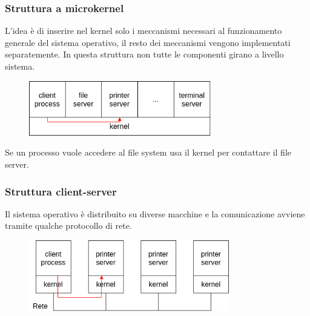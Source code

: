 \subsubsection{Struttura a microkernel}
L'idea è di inserire nel kernel solo i meccanismi necessari al funzionamento generale del sistema operativo, il resto dei meccanismi vengono implementati separatemente. In questa struttura non tutte le componenti girano a livello sistema.
\begin{figure}[H]
    \centering
    \includegraphics[width=300px]{images/1_Introduzione/microkernel.png}
\end{figure}
Se un processo vuole accedere al file system usa il kernel per contattare il file server.

\subsubsection{Struttura client-server}
Il sistema operativo è distribuito su diverse macchine e la comunicazione avviene tramite qualche protocollo di rete.
\begin{figure}[H]
    \centering
    \includegraphics[width=330px]{images/1_Introduzione/network-kernel.png}
\end{figure}

